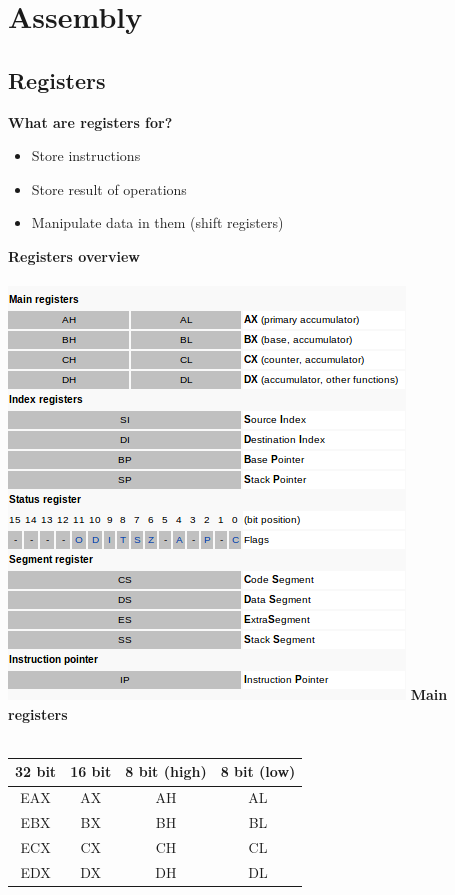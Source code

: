 \documentclass[10pt,a4paper]{book}
\begin{document}
\chapter{Assembly}
\section{Registers}
\textbf{What are registers for?}
\begin{itemize}[noitemsep,nolistsep]
\item Store instructions
\item Store result of operations
\item Manipulate data in them (shift registers)
\end{itemize}
\textbf{Registers overview}\\\\
\includegraphics[scale=0.6]{registers.png}
\newpage
\textbf{Main registers}\\\\
\begin{tabular}{|c|c|c|c|}
\hline 
32 bit & 16 bit & 8 bit (high) & 8 bit (low) \\ 
\hline 
EAX & AX & AH & AL \\ 
\hline 
EBX & BX & BH & BL \\ 
\hline 
ECX & CX & CH & CL \\ 
\hline 
EDX & DX & DH & DL \\ 
\hline 
\end{tabular} 
\\\\
\end{document}
